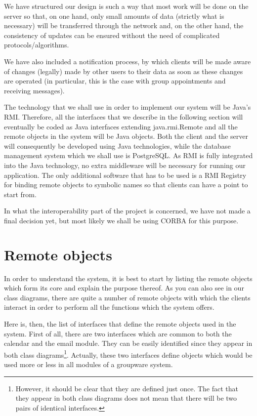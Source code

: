 \documentclass[a4paper,10pt]{article}
\begin{document}
We have structured our design is such a way that most work will be done on the server so that,
on one hand, only small amounts of data (strictly what is necessary) will be transferred through
the network and, on the other hand, the consistency of updates can be ensured without the need
of complicated protocols/algorithms.

We have also included a notification process, by which clients will be made aware of changes
(legally) made by other users to their data as soon as these changes are operated (in particular,
this is the case with group appointments and receiving messages).

The technology that we shall use in order to implement our system will be Java's RMI. Therefore,
all the interfaces that we describe in the following section will eventually be coded as Java
interfaces extending java.rmi.Remote and all the remote objects in the system will be Java
objects. Both the client and the server will consequently be developed using Java technologies,
while the database management system which we shall use is PostgreSQL. As RMI is fully integrated
into the Java technology, no extra middleware will be necessary for running our application.
The only additional software that has to be used is a RMI Registry for binding remote objects
to symbolic names so that clients can have a point to start from.

In what the interoperability part of the project is concerned, we have not made a final decision
yet, but most likely we shall be using CORBA for this purpose.

\section{Remote objects}

In order to understand the system, it is best to start by listing the remote objects which form
its core and explain the purpose thereof. As you can also see in our class diagrams, there are
quite a number of remote objects with which the clients interact in order to perform all the
functions which the system offers.

Here is, then, the list of interfaces that define the remote objects used in the system. First of all,
there are two interfaces which are common to both the calendar and the email module. They
can be easily identified since they appear in both class diagrams\footnote{However, it should
be clear that they are defined just once. The fact that they appear in both class diagrams does
not mean that there will be two pairs of identical interfaces.}. Actually, these two interfaces
define objects which would be used more or less in all modules of a groupware system.
\end{document}
